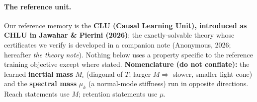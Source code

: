 \documentclass[11pt]{article}
\begin{document}
\paragraph{The reference unit.} Our reference memory is the \textbf{CLU (Causal Learning Unit), introduced as CHLU in Jawahar \& Pierini (2026)}; the exactly-solvable theory whose certificates we verify is developed in a companion note (Anonymous, 2026; hereafter \emph{the theory note}). Nothing below uses a property specific to the reference training objective except where stated. \textbf{Nomenclature (do not conflate):} the learned \textbf{inertial mass} $M_i$ (diagonal of $T$; larger $M\Rightarrow$ slower, smaller light-cone) and the \textbf{spectral mass} $\mu_k$ (a normal-mode stiffness) run in opposite directions. Reach statements use $M$; retention statements use $\mu$.
\end{document}
